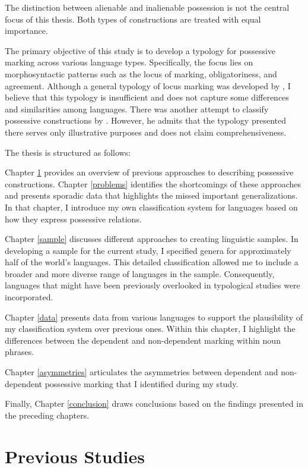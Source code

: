 The distinction between alienable and inalienable possession \citep{nichols1988alienable,alexiadou2003some} is not the central focus of this thesis. Both types of constructions are treated with equal importance.

The primary objective of this study is to develop a typology for possessive marking across various language types. Specifically, the focus lies on morphosyntactic patterns such as the locus of marking, obligatoriness, and agreement. Although a general typology of locus marking was developed by \cite{nichols1986head}, I believe that this typology is insufficient and does not capture some differences and similarities among languages. There was another attempt to classify possessive constructions by \cite{croft2002typology}. However, he admits that the typology presented there serves only illustrative purposes and does not claim comprehensiveness.

The thesis is structured as follows:

Chapter \ref{litreview} provides an overview of previous approaches to describing possessive constructions. Chapter \ref{problems} identifies the shortcomings of these approaches and presents sporadic data that highlights the missed important generalizations. In that chapter, I introduce my own classification system for languages based on how they express possessive relations.

Chapter \ref{sample} discusses different approaches to creating linguistic samples. In developing a sample for the current study, I specified genera for approximately half of the world's languages. This detailed classification allowed me to include a broader and more diverse range of languages in the sample. Consequently, languages that might have been previously overlooked in typological studies were incorporated.

Chapter \ref{data} presents data from various languages to support the plausibility of my classification system over previous ones. Within this chapter, I highlight the differences between the dependent and non-dependent marking within noun phrases.

Chapter \ref{asymmetries} articulates the asymmetries between dependent and non-dependent possessive marking that I identified during my study. 

Finally, Chapter \ref{conclusion} draws conclusions based on the findings presented in the preceding chapters.

\section{Previous Studies}
\label{litreview}

